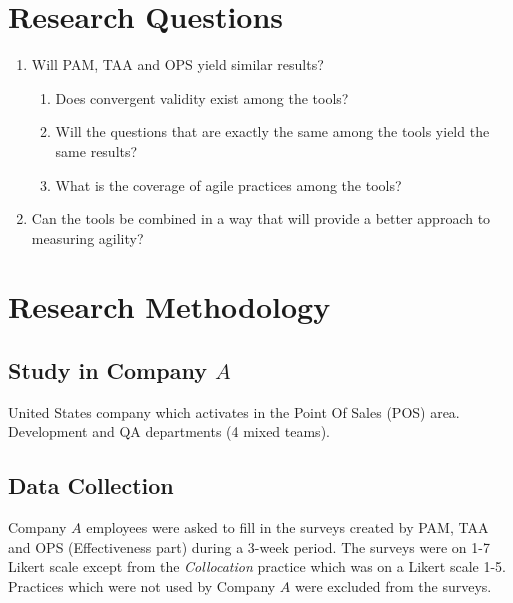
\section{Research Questions}

\begin{enumerate}
	\item Will PAM, TAA and OPS yield similar results?
	\begin{enumerate}[label*=\arabic*.]
  		\item Does convergent validity exist among the tools?
  		\item Will the questions that are exactly the same among the tools yield the same results?
		\item What is the coverage of agile practices among the tools?
	\end{enumerate}	
  	\item Can the tools be combined in a way that will provide a better approach to measuring agility?
\end{enumerate}

\clearpage



\section{Research Methodology}


\subsection{Study in Company $A$}

United States company which activates in the Point Of Sales (POS) area. \\
Development and QA departments (4 mixed teams). \\


\subsection{Data Collection}

Company $A$ employees were asked to fill in the surveys created by PAM, TAA and OPS (Effectiveness part) during a 3-week period. The surveys were on 1-7 Likert scale except from the \textit{Collocation} practice which was on a Likert scale 1-5.
Practices which were not used by Company $A$ were excluded from the surveys.

